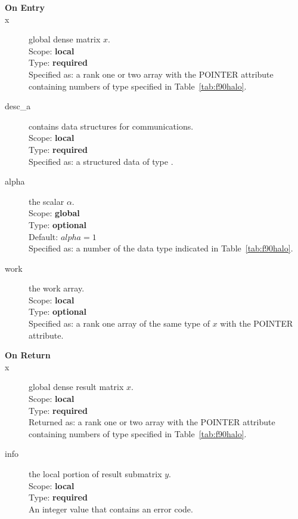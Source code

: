 \begin{description}
\item[\bf On Entry]
\item[x] global dense matrix $x$.\\
Scope: {\bf local} \\
Type: {\bf required} \\
Specified as:  a rank one or two array with the POINTER attribute
containing numbers of type specified in
Table~\ref{tab:f90halo}.
\item[desc\_a] contains data structures for communications.\\
Scope: {\bf local} \\
Type: {\bf required}\\
Specified as: a structured data of type \descdata.
\item[alpha] the scalar $\alpha$.\\
Scope: {\bf global} \\
Type: {\bf optional} \\
Default: $alpha = 1 $\\	
Specified as: a number of the data type indicated in Table~\ref{tab:f90halo}.
\item[work] the work array. \\
Scope: {\bf local} \\
Type: {\bf optional}\\
Specified as: a rank one array of the same type of $x$ with the
POINTER attribute.

\item[\bf On Return] 
\item[x] global dense result matrix $x$.\\
Scope: {\bf local} \\
Type: {\bf required} \\
Returned as:  a rank one or two array with the POINTER attribute
containing numbers of type specified in
Table~\ref{tab:f90halo}.
\item[info] the local portion of result submatrix $y$.\\
Scope: {\bf local} \\
Type: {\bf required} \\
An integer value that contains an error code. 
\end{description}
%
%



